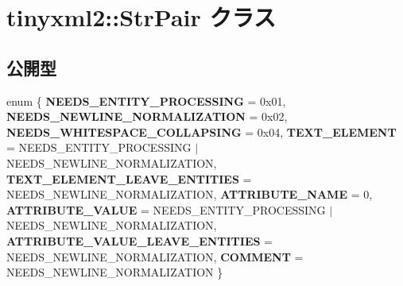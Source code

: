 \hypertarget{classtinyxml2_1_1_str_pair}{}\section{tinyxml2\+:\+:Str\+Pair クラス}
\label{classtinyxml2_1_1_str_pair}
\subsection*{公開型}
\begin{DoxyCompactItemize}
\item 
\mbox{\label{classtinyxml2_1_1_str_pair_a0301ef962e15dd94574431f1c61266c5}} 
enum \{ \newline
{\bfseries N\+E\+E\+D\+S\+\_\+\+E\+N\+T\+I\+T\+Y\+\_\+\+P\+R\+O\+C\+E\+S\+S\+I\+NG} = 0x01, 
{\bfseries N\+E\+E\+D\+S\+\_\+\+N\+E\+W\+L\+I\+N\+E\+\_\+\+N\+O\+R\+M\+A\+L\+I\+Z\+A\+T\+I\+ON} = 0x02, 
{\bfseries N\+E\+E\+D\+S\+\_\+\+W\+H\+I\+T\+E\+S\+P\+A\+C\+E\+\_\+\+C\+O\+L\+L\+A\+P\+S\+I\+NG} = 0x04, 
{\bfseries T\+E\+X\+T\+\_\+\+E\+L\+E\+M\+E\+NT} = N\+E\+E\+D\+S\+\_\+\+E\+N\+T\+I\+T\+Y\+\_\+\+P\+R\+O\+C\+E\+S\+S\+I\+NG $\vert$ N\+E\+E\+D\+S\+\_\+\+N\+E\+W\+L\+I\+N\+E\+\_\+\+N\+O\+R\+M\+A\+L\+I\+Z\+A\+T\+I\+ON, 
\newline
{\bfseries T\+E\+X\+T\+\_\+\+E\+L\+E\+M\+E\+N\+T\+\_\+\+L\+E\+A\+V\+E\+\_\+\+E\+N\+T\+I\+T\+I\+ES} = N\+E\+E\+D\+S\+\_\+\+N\+E\+W\+L\+I\+N\+E\+\_\+\+N\+O\+R\+M\+A\+L\+I\+Z\+A\+T\+I\+ON, 
{\bfseries A\+T\+T\+R\+I\+B\+U\+T\+E\+\_\+\+N\+A\+ME} = 0, 
{\bfseries A\+T\+T\+R\+I\+B\+U\+T\+E\+\_\+\+V\+A\+L\+UE} = N\+E\+E\+D\+S\+\_\+\+E\+N\+T\+I\+T\+Y\+\_\+\+P\+R\+O\+C\+E\+S\+S\+I\+NG $\vert$ N\+E\+E\+D\+S\+\_\+\+N\+E\+W\+L\+I\+N\+E\+\_\+\+N\+O\+R\+M\+A\+L\+I\+Z\+A\+T\+I\+ON, 
{\bfseries A\+T\+T\+R\+I\+B\+U\+T\+E\+\_\+\+V\+A\+L\+U\+E\+\_\+\+L\+E\+A\+V\+E\+\_\+\+E\+N\+T\+I\+T\+I\+ES} = N\+E\+E\+D\+S\+\_\+\+N\+E\+W\+L\+I\+N\+E\+\_\+\+N\+O\+R\+M\+A\+L\+I\+Z\+A\+T\+I\+ON, 
\newline
{\bfseries C\+O\+M\+M\+E\+NT} = N\+E\+E\+D\+S\+\_\+\+N\+E\+W\+L\+I\+N\+E\+\_\+\+N\+O\+R\+M\+A\+L\+I\+Z\+A\+T\+I\+ON
 \}
\end{DoxyCompactItemize}
